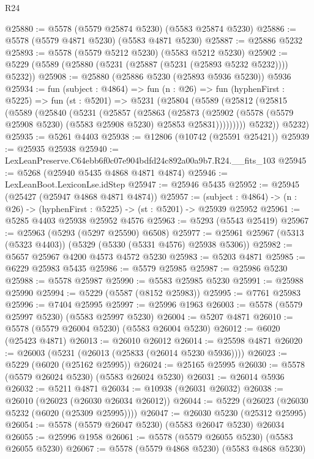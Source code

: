 \begin{lexlean}{R24}
\begin{coremodule}
@25880 := @5578 (@5579 @25874 @5230) (@5583 @25874 @5230)
@25886 := @5578 (@5579 @4871 @5230) (@5583 @4871 @5230)
@25887 := @25886 @5232
@25893 := @5578 (@5579 @5212 @5230) (@5583 @5212 @5230)
@25902 := @5229 (@5589 (@25880 (@5231 (@25887 (@5231 (@25893 @5232 @5232)))) @5232))
@25908 := @25880 (@25886 @5230 (@25893 @5936 @5230)) @5936
@25934 := fun (subject : @4864) =>
  fun (n : @26) =>
  fun (hyphenFirst : @5225) =>
  fun (st : @5201) =>
  @5231
    (@25804
      (@5589
        (@25812
          (@25815
            (@5589
              (@25840
                (@5231
                  (@25857
                    (@25863
                      (@25873
                        (@25902
                          (@5578 (@5579 @25908 @5230) (@5583 @25908 @5230) @25853 @25831)))))))))
          @5232))
      @5232)
@25935 := @5261 @4403
@25938 := @12806 (@10742 (@25591 @25421))
@25939 := @25935 @25938
@25940 := LexLeanPreserve.C64ebb6f0c07e904bdfd24c892a00a9b7.R24.__fits_103
@25945 := @5268 (@25940 @5435 @4868 @4871 @4874)
@25946 := LexLeanBoot.LexiconLse.idStep
@25947 := @25946 @5435
@25952 := @25945 (@25427 (@25947 @4868 @4871 @4874))
@25957 := (subject : @4864) -> (n : @26) -> (hyphenFirst : @5225) -> (st : @5201) -> @25939 @25952
@25961 := @5285 @4403 @25938 @25952 @4576
@25963 := @5293 (@5543 @25419)
@25967 := @25963 (@5293 (@5297 @25590) @6508)
@25977 := @25961 @25967 (@5313 (@5323 @4403)) (@5329 (@5330 (@5331 @4576) @25938 @5306))
@25982 := @5657 @25967 @4200 @4573 @4572 @5230
@25983 := @5203 @4871
@25985 := @6229 @25983 @5435
@25986 := @5579 @25985
@25987 := @25986 @5230
@25988 := @5578 @25987
@25990 := @5583 @25985 @5230
@25991 := @25988 @25990
@25994 := @5229 (@5587 (@8152 @25983))
@25995 := @7761 @25983
@25996 := @7404 @25995
@25997 := @25996 @1963
@26003 := @5578 (@5579 @25997 @5230) (@5583 @25997 @5230)
@26004 := @5207 @4871
@26010 := @5578 (@5579 @26004 @5230) (@5583 @26004 @5230)
@26012 := @6020 (@25423 @4871)
@26013 := @26010 @26012
@26014 := @25598 @4871
@26020 := @26003 (@5231 (@26013 (@25833 (@26014 @5230 @5936))))
@26023 := @5229 (@6020 (@25162 @25995))
@26024 := @25165 @25995
@26030 := @5578 (@5579 @26024 @5230) (@5583 @26024 @5230)
@26031 := @26014 @5936
@26032 := @5211 @4871
@26034 := @10938 (@26031 @26032)
@26038 := @26010 (@26023 (@26030 @26034 @26012))
@26044 := @5229 (@26023 (@26030 @5232 (@6020 (@25309 @25995))))
@26047 := @26030 @5230 (@25312 @25995)
@26054 := @5578 (@5579 @26047 @5230) (@5583 @26047 @5230) @26034
@26055 := @25996 @1958
@26061 := @5578 (@5579 @26055 @5230) (@5583 @26055 @5230)
@26067 := @5578 (@5579 @4868 @5230) (@5583 @4868 @5230)

\end{coremodule}
\end{lexlean}
